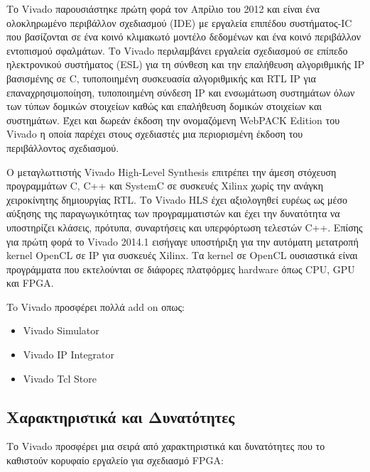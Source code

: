 Το Vivado παρουσιάστηκε πρώτη φορά τον Απρίλιο του 2012 και είναι ένα ολοκληρωμένο περιβάλλον σχεδιασμού (IDE) με εργαλεία επιπέδου συστήματος-IC που 
βασίζονται σε ένα κοινό κλιμακωτό μοντέλο δεδομένων και ένα κοινό περιβάλλον εντοπισμού σφαλμάτων.
Το Vivado περιλαμβάνει εργαλεία σχεδιασμού σε επίπεδο ηλεκτρονικού συστήματος (ESL) για τη σύνθεση και την επαλήθευση αλγοριθμικής IP βασισμένης σε C,
τυποποιημένη συσκευασία αλγοριθμικής και RTL IP για επαναχρησιμοποίηση, τυποποιημένη σύνδεση IP και ενσωμάτωση συστημάτων όλων των τύπων δομικών στοιχείων
καθώς και επαλήθευση δομικών στοιχείων και συστημάτων. Έχει και δωρεάν έκδοση την ονομαζόμενη WebPACK Edition του Vivado η οποία παρέχει στους σχεδιαστές
μια περιορισμένη έκδοση του περιβάλλοντος σχεδιασμού.

Ο μεταγλωττιστής Vivado High-Level Synthesis επιτρέπει την άμεση στόχευση προγραμμάτων C, C++ και SystemC σε συσκευές Xilinx χωρίς την ανάγκη χειροκίνητης δημιουργίας RTL.
Το Vivado HLS έχει αξιολογηθεί ευρέως ως μέσο αύξησης της παραγωγικότητας των προγραμματιστών και έχει την δυνατότητα να υποστηρίζει κλάσεις, πρότυπα, συναρτήσεις και υπερφόρτωση τελεστών C++.
Επίσης για πρώτη φορά το Vivado 2014.1 εισήγαγε υποστήριξη για την αυτόματη μετατροπή kernel OpenCL σε IP για συσκευές Xilinx.
Τα kernel σε OpenCL ουσιαστικά είναι προγράμματα που εκτελούνται σε διάφορες πλατφόρμες hardware όπως CPU, GPU και FPGA.

To Vivado προσφέρει πολλά add on οπως:
\begin{itemize}
  \item Vivado Simulator
  \item Vivado IP Integrator
  \item Vivado Tcl Store
\end{itemize}

\subsection{Χαρακτηριστικά και Δυνατότητες}

Το Vivado προσφέρει μια σειρά από χαρακτηριστικά και δυνατότητες που το καθιστούν κορυφαίο εργαλείο για σχεδιασμό FPGA:

